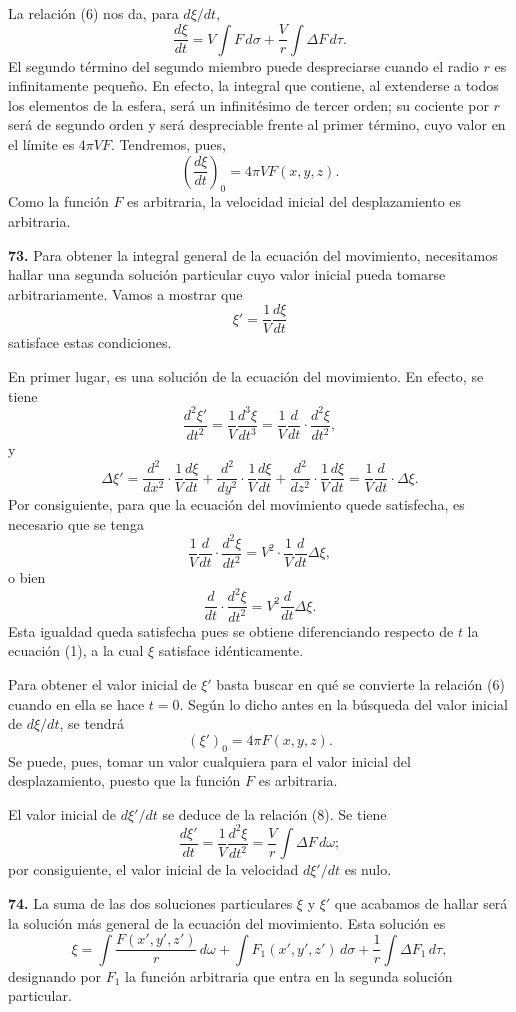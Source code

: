 La relación (6) nos da, para $d\xi/dt$,
\[
\frac{d\xi}{dt} = V\int F\,d\sigma + \frac{V}{r}\int \Delta F\,d\tau.
\]
El segundo término del segundo miembro puede despreciarse cuando el radio
$r$ es infinitamente pequeño. En efecto, la integral que contiene, al
extenderse a todos los elementos de la esfera, será un infinitésimo de
tercer orden; su cociente por $r$ será de segundo orden y será despreciable
frente al primer término, cuyo valor en el límite es $4\pi V F$. Tendremos,
pues,
\[
\left(\frac{d\xi}{dt}\right)_0 = 4\pi V F(x,y,z). \tag{9}
\]
Como la función $F$ es arbitraria, la velocidad inicial del desplazamiento
es arbitraria.

\noindent\textbf{73.} Para obtener la integral general de la ecuación del
movimiento, necesitamos hallar una segunda solución particular cuyo valor
inicial pueda tomarse arbitrariamente. Vamos a mostrar que
\[
\xi' = \frac{1}{V}\frac{d\xi}{dt}
\]
satisface estas condiciones.

En primer lugar, es una solución de la ecuación del movimiento. En efecto,
se tiene
\[
\frac{d^2\xi'}{dt^2} = \frac{1}{V}\frac{d^3\xi}{dt^3}
= \frac{1}{V}\frac{d}{dt}\cdot\frac{d^2\xi}{dt^2},
\]
y
\[
\Delta\xi' = \frac{d^2}{dx^2}\cdot\frac{1}{V}\frac{d\xi}{dt}
+ \frac{d^2}{dy^2}\cdot\frac{1}{V}\frac{d\xi}{dt}
+ \frac{d^2}{dz^2}\cdot\frac{1}{V}\frac{d\xi}{dt}
= \frac{1}{V}\frac{d}{dt}\cdot\Delta\xi.
\]
Por consiguiente, para que la ecuación del movimiento quede satisfecha, es
necesario que se tenga
\[
\frac{1}{V}\frac{d}{dt}\cdot\frac{d^2\xi}{dt^2} = V^2\cdot\frac{1}{V}\frac{d}{dt}\Delta\xi,
\]
o bien
\[
\frac{d}{dt}\cdot\frac{d^2\xi}{dt^2} = V^2\frac{d}{dt}\Delta\xi.
\]
Esta igualdad queda satisfecha pues se obtiene diferenciando respecto de
$t$ la ecuación (1), a la cual $\xi$ satisface idénticamente.

Para obtener el valor inicial de $\xi'$ basta buscar en qué se convierte la
relación (6) cuando en ella se hace $t=0$. Según lo dicho antes en la
búsqueda del valor inicial de $d\xi/dt$, se tendrá
\[
(\xi')_0 = 4\pi F(x,y,z). \tag{10}
\]
Se puede, pues, tomar un valor cualquiera para el valor inicial del
desplazamiento, puesto que la función $F$ es arbitraria.

El valor inicial de $d\xi'/dt$ se deduce de la relación (8). Se tiene
\[
\frac{d\xi'}{dt} = \frac{1}{V}\frac{d^2\xi}{dt^2} = \frac{V}{r}\int \Delta F\,d\omega;
\]
por consiguiente, el valor inicial de la velocidad $d\xi'/dt$ es nulo.

\noindent\textbf{74.} La suma de las dos soluciones particulares $\xi$ y
$\xi'$ que acabamos de hallar será la solución más general de la ecuación
del movimiento. Esta solución es
\[
\xi = \int \frac{F(x',y',z')}{r}\,d\omega + \int F_1(x',y',z')\,d\sigma
+ \frac{1}{r}\int \Delta F_1\,d\tau,
\]
designando por $F_1$ la función arbitraria que entra en la segunda solución
particular.

